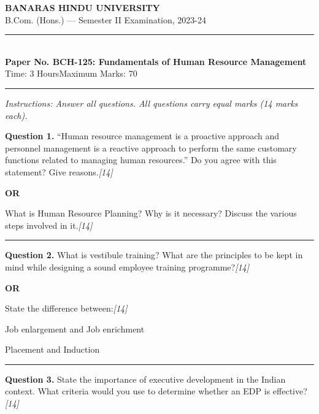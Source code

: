 \documentclass[11pt,a4paper]{article}
\newcommand{\pts}[1]{\hfill   \textit{[#1]}}
\begin{document}
\begin{center}
  {\large\bfseries BANARAS HINDU UNIVERSITY}\\[2pt]
  {\normalsize B.Com. (Hons.) --- Semester II Examination, 2023-24}\\[6pt]
  \rule{0.8\linewidth}{0.5pt}\\[6pt]
  {\large\bfseries Paper No. BCH-125: Fundamentals of Human Resource Management}\\[4pt]
  {\normalsize Time: 3 Hours\hfill Maximum Marks: 70}
\end{center}

\rule{\linewidth}{0.4pt}

\smallskip



\noindent   \textit{Instructions: Answer all questions. All questions carry equal marks (14 marks each).}

\bigskip




\noindent   \textbf{Question 1.}
``Human resource management is a proactive approach and personnel management is a reactive approach to perform the same customary functions related to managing human resources.'' Do you agree with this statement? Give reasons.\pts{14}

\centerline{   \textbf{OR}}

What is Human Resource Planning? Why is it necessary? Discuss the various steps involved in it.\pts{14}

\medskip\rule{\linewidth}{0.2pt}




\noindent   \textbf{Question 2.}
What is vestibule training? What are the principles to be kept in mind while designing a sound employee training programme?\pts{14}

\centerline{   \textbf{OR}}

State the difference between:\pts{14}

\begin{parts}
  \item Job enlargement and Job enrichment
  \item Placement and Induction
\end{parts}

\medskip\rule{\linewidth}{0.2pt}




\noindent   \textbf{Question 3.}
State the importance of executive development in the Indian context. What criteria would you use to determine whether an EDP is effective?\pts{14}
\end{document}
